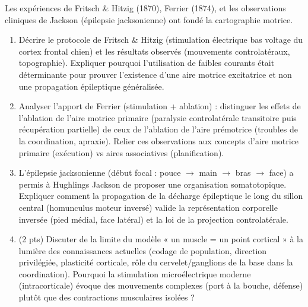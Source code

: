 \documentclass[11pt]{article}
\begin{document}
\begin{exercice}
Les expériences de Fritsch \& Hitzig (1870), Ferrier (1874), et les observations cliniques de Jackson (épilepsie jacksonienne) ont fondé la cartographie motrice.
\begin{enumerate}
    \item Décrire le protocole de Fritsch \& Hitzig (stimulation électrique bas voltage du cortex frontal chien) et les résultats observés (mouvements controlatéraux, topographie). Expliquer pourquoi l'utilisation de faibles courants était déterminante pour prouver l'existence d'une aire motrice excitatrice et non une propagation épileptique généralisée.
    \item Analyser l'apport de Ferrier (stimulation + ablation) : distinguer les effets de l'ablation de l'aire motrice primaire (paralysie controlatérale transitoire puis récupération partielle) de ceux de l'ablation de l'aire prémotrice (troubles de la coordination, apraxie). Relier ces observations aux concepts d'aire motrice primaire (exécution) vs aires associatives (planification).
    \item L'épilepsie jacksonienne (début focal : pouce $\rightarrow$ main $\rightarrow$ bras $\rightarrow$ face) a permis à Hughlings Jackson de proposer une organisation somatotopique. Expliquer comment la propagation de la décharge épileptique le long du sillon central (homunculus moteur inversé) valide la représentation corporelle inversée (pied médial, face latéral) et la loi de la projection controlatérale.
    \item (2 pts) Discuter de la limite du modèle « un muscle = un point cortical » à la lumière des connaissances actuelles (codage de population, direction privilégiée, plasticité corticale, rôle du cervelet/ganglions de la base dans la coordination). Pourquoi la stimulation microélectrique moderne (intracorticale) évoque des mouvements complexes (port à la bouche, défense) plutôt que des contractions musculaires isolées ?
\end{enumerate}
\end{exercice}
\end{document}
